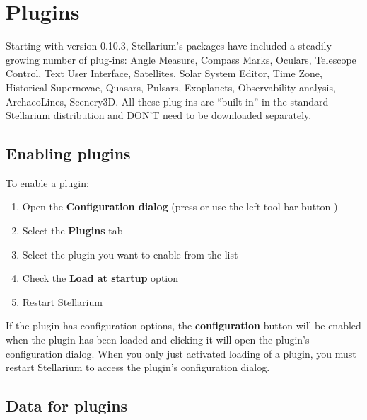 
\chapter{Plugins}
\label{ch:Plugins}

Starting with version 0.10.3, Stellarium's packages have included a steadily growing number of
plug-ins: Angle Measure, Compass Marks, Oculars, Telescope Control, Text
User Interface, Satellites, Solar System Editor, Time Zone, Historical
Supernovae, Quasars, Pulsars, Exoplanets, Observability analysis, ArchaeoLines, Scenery3D. All
these plug-ins are ``built-in'' in the standard Stellarium distribution
and DON'T need to be downloaded separately.


\section{Enabling plugins}
\label{sec:Plugins:EnablingPlugins}


To enable a plugin:

\begin{enumerate}
\item Open the \textbf{Configuration dialog} (press  or use
  the left tool bar button )
\item Select the \textbf{Plugins} tab
\item Select the plugin you want to enable from the list
\item Check the \textbf{Load at startup} option
\item Restart Stellarium
\end{enumerate}

\noindent If the plugin has configuration options, the
\textbf{configuration} button will be enabled when the plugin has been
loaded and clicking it will open the plugin's configuration
dialog. When you only just activated loading of a plugin, you must
restart Stellarium to access the plugin's configuration dialog.

\section{Data for plugins}
\label{sec:Plugins:DataForPlugins}

